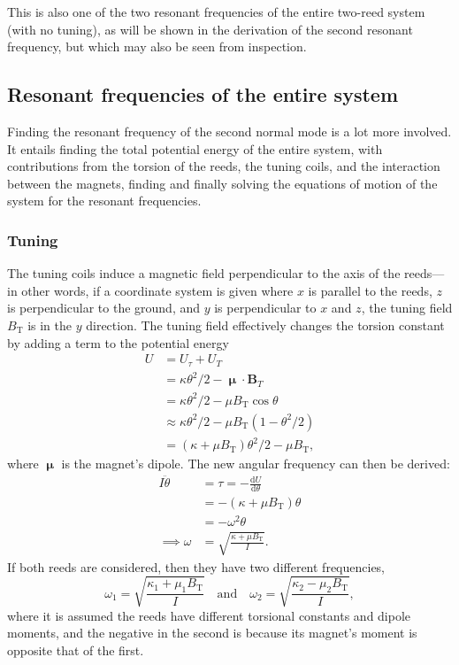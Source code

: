 \documentclass{article}
\begin{document}
This is also one of the two resonant frequencies of the entire two-reed system (with no tuning), as will be shown in the derivation of the second resonant frequency, but which may also be seen from inspection.

\subsection{Resonant frequencies of the entire system}
Finding the resonant frequency of the second normal mode is a lot more involved. It entails finding the total potential energy of the entire system, with contributions from the torsion of the reeds, the tuning coils, and the interaction between the magnets, finding and finally solving the equations of motion of the system for the resonant frequencies.
\subsubsection{Tuning}
The tuning coils induce a magnetic field perpendicular to the axis of the reeds---in other words, if a coordinate system is given where $x$ is parallel to the reeds, $z$ is perpendicular to the ground, and $y$ is perpendicular to $x$ and $z$, the tuning field $B_\text{T}$ is in the $y$ direction. The tuning field effectively changes the torsion constant by adding a term to the potential energy
\begin{equation*}
  \begin{aligned}
    U   &= U_\tau + U_T \\
    &= \kappa\theta^2/2 - \bm{\upmu}\cdot\mathbf{B}_T \\
    &= \kappa\theta^2/2 - \mu B_\text{T} \cos \theta \\
    &\approx \kappa\theta^2/2 - \mu B_\text{T} (1-\theta^2/2) \\
    &= (\kappa+\mu B_\text{T})\theta^2/2 - \mu B_\text{T},
  \end{aligned}
\end{equation*}
where $\bm{\upmu}$ is the magnet's dipole. The new angular frequency can then be derived:
\begin{equation*}
  \begin{aligned}
    I \ddot{\theta} &= \tau = -\frac{\mathrm{d}U}{\mathrm{d}\theta} \\
    &= -(\kappa + \mu B_\text{T})\theta \\
    &= -\omega^2 \theta \\
    \implies \omega &=  \sqrt{\frac{\kappa + \mu B_\text{T}}{I}}.
  \end{aligned}
\end{equation*}
If both reeds are considered, then they have two different frequencies,
\begin{equation*}
  \omega_1 = \sqrt{\frac{\kappa_1 + \mu_1 B_\text{T}}{I}}\quad\text{and}\quad\omega_2 = \sqrt{\frac{\kappa_2 - \mu_2 B_\text{T}}{I}},
\end{equation*}
where it is assumed the reeds have different torsional constants and dipole moments, and the negative in the second is because its magnet's moment is opposite that of the first.
\end{document}
